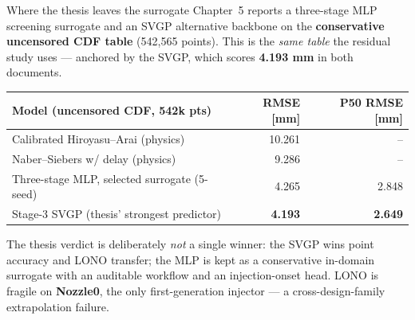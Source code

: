 \documentclass[UTF8,aspectratio=169]{ctexbeamer}
\begin{document}
\begin{frame}{Where the thesis leaves the surrogate}
\small
Chapter~5 reports a three-stage MLP screening surrogate and an SVGP alternative
backbone on the \textbf{conservative uncensored CDF table} (542{,}565 points).
This is the \emph{same table} the residual study uses --- anchored by the SVGP,
which scores \textbf{4.193 mm} in both documents.

\vspace{0.3em}
\begin{center}
\renewcommand{\arraystretch}{1.15}
\setlength{\tabcolsep}{6pt}
\begin{tabular}{@{}lrr@{}}
\toprule
\textbf{Model (uncensored CDF, 542k pts)} & \textbf{RMSE [mm]} & \textbf{P50 RMSE [mm]} \\
\midrule
Calibrated Hiroyasu--Arai (physics)      & 10.261 & -- \\
Naber--Siebers w/ delay (physics)        & \phantom{0}9.286 & -- \\
Three-stage MLP, selected surrogate (5-seed) & \phantom{0}4.265 & 2.848 \\
\rowcolor{softrow}
Stage-3 SVGP (thesis' strongest predictor) & \textbf{\phantom{0}4.193} & \textbf{2.649} \\
\bottomrule
\end{tabular}
\end{center}

\vspace{0.4em}
\footnotesize
The thesis verdict is deliberately \emph{not} a single winner: the SVGP wins point
accuracy and LONO transfer; the MLP is kept as a conservative in-domain surrogate
with an auditable workflow and an injection-onset head. LONO is fragile on
\textbf{Nozzle0}, the only first-generation injector --- a cross-design-family
extrapolation failure.
\end{frame}
\end{document}
